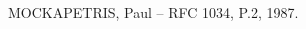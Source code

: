 \begin{thebibliography}{1}









MOCKAPETRIS, Paul -- RFC 1034, P.2, 1987.


\end{thebibliography}
